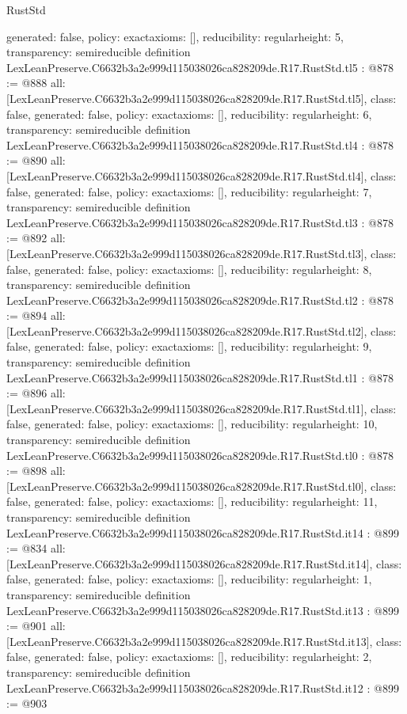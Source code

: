 \begin{lexlean}{RustStd}
\begin{coremodule}
{  generated: false,
  policy: exact{axioms: []},
  reducibility: regular{height: 5},
  transparency: semireducible
}
definition LexLeanPreserve.C6632b3a2e999d115038026ca828209de.R17.RustStd.tl5 : @878 := @888 {
  all: [LexLeanPreserve.C6632b3a2e999d115038026ca828209de.R17.RustStd.tl5],
  class: false,
  generated: false,
  policy: exact{axioms: []},
  reducibility: regular{height: 6},
  transparency: semireducible
}
definition LexLeanPreserve.C6632b3a2e999d115038026ca828209de.R17.RustStd.tl4 : @878 := @890 {
  all: [LexLeanPreserve.C6632b3a2e999d115038026ca828209de.R17.RustStd.tl4],
  class: false,
  generated: false,
  policy: exact{axioms: []},
  reducibility: regular{height: 7},
  transparency: semireducible
}
definition LexLeanPreserve.C6632b3a2e999d115038026ca828209de.R17.RustStd.tl3 : @878 := @892 {
  all: [LexLeanPreserve.C6632b3a2e999d115038026ca828209de.R17.RustStd.tl3],
  class: false,
  generated: false,
  policy: exact{axioms: []},
  reducibility: regular{height: 8},
  transparency: semireducible
}
definition LexLeanPreserve.C6632b3a2e999d115038026ca828209de.R17.RustStd.tl2 : @878 := @894 {
  all: [LexLeanPreserve.C6632b3a2e999d115038026ca828209de.R17.RustStd.tl2],
  class: false,
  generated: false,
  policy: exact{axioms: []},
  reducibility: regular{height: 9},
  transparency: semireducible
}
definition LexLeanPreserve.C6632b3a2e999d115038026ca828209de.R17.RustStd.tl1 : @878 := @896 {
  all: [LexLeanPreserve.C6632b3a2e999d115038026ca828209de.R17.RustStd.tl1],
  class: false,
  generated: false,
  policy: exact{axioms: []},
  reducibility: regular{height: 10},
  transparency: semireducible
}
definition LexLeanPreserve.C6632b3a2e999d115038026ca828209de.R17.RustStd.tl0 : @878 := @898 {
  all: [LexLeanPreserve.C6632b3a2e999d115038026ca828209de.R17.RustStd.tl0],
  class: false,
  generated: false,
  policy: exact{axioms: []},
  reducibility: regular{height: 11},
  transparency: semireducible
}
definition LexLeanPreserve.C6632b3a2e999d115038026ca828209de.R17.RustStd.it14 : @899 := @834 {
  all: [LexLeanPreserve.C6632b3a2e999d115038026ca828209de.R17.RustStd.it14],
  class: false,
  generated: false,
  policy: exact{axioms: []},
  reducibility: regular{height: 1},
  transparency: semireducible
}
definition LexLeanPreserve.C6632b3a2e999d115038026ca828209de.R17.RustStd.it13 : @899 := @901 {
  all: [LexLeanPreserve.C6632b3a2e999d115038026ca828209de.R17.RustStd.it13],
  class: false,
  generated: false,
  policy: exact{axioms: []},
  reducibility: regular{height: 2},
  transparency: semireducible
}
definition LexLeanPreserve.C6632b3a2e999d115038026ca828209de.R17.RustStd.it12 : @899 := @903 {
}
\end{coremodule}
\end{lexlean}
